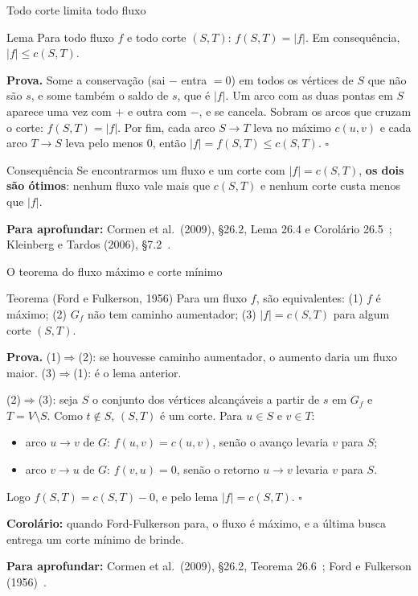 \documentclass[aspectratio=169,xcolor=table]{beamer}
\newcommand{\fonte}[1]{%
  \vfill
  {\tiny\color{gray!55!black}\textbf{Para aprofundar:} #1\par}%
}
\begin{document}
\begin{frame}{Todo corte limita todo fluxo}
  \begin{block}{Lema}
    \small
    Para todo fluxo $f$ e todo corte $(S,T)$: $f(S,T) = |f|$. Em consequência,
    $|f| \le c(S,T)$.
  \end{block}
  \scriptsize
  \textbf{Prova.} Some a conservação (sai $-$ entra $= 0$) em todos os vértices de $S$ que não
  são $s$, e some também o saldo de $s$, que é $|f|$. Um arco com as duas pontas em $S$ aparece
  uma vez com $+$ e outra com $-$, e se cancela. Sobram os arcos que cruzam o corte: $f(S,T) =
  |f|$. Por fim, cada arco $S \to T$ leva no máximo $c(u,v)$ e cada arco $T \to S$ leva pelo
  menos $0$, então $|f| = f(S,T) \le c(S,T)$. \hfill$\square$
  \medskip

  \begin{exampleblock}{Consequência}
    \small Se encontrarmos um fluxo e um corte com $|f| = c(S,T)$, \textbf{os dois são
    ótimos}: nenhum fluxo vale mais que $c(S,T)$ e nenhum corte custa menos que $|f|$.
  \end{exampleblock}
  \fonte{Cormen et al.\ (2009), \S 26.2, Lema 26.4 e Corolário 26.5~\cite{cormen2009introduction};
    Kleinberg e Tardos (2006), \S 7.2~\cite{kleinberg2006algorithm}.}
\end{frame}

\begin{frame}{O teorema do fluxo máximo e corte mínimo}
  \begin{block}{Teorema (Ford e Fulkerson, 1956)}
    \small
    Para um fluxo $f$, são equivalentes:
    (1) $f$ é máximo; (2) $G_f$ não tem caminho aumentador;
    (3) $|f| = c(S,T)$ para algum corte $(S,T)$.
  \end{block}
  \scriptsize
  \textbf{Prova.} (1)$\Rightarrow$(2): se houvesse caminho aumentador, o aumento daria um fluxo
  maior. (3)$\Rightarrow$(1): é o lema anterior.
  \smallskip

  (2)$\Rightarrow$(3): seja $S$ o conjunto dos vértices alcançáveis a partir de $s$ em $G_f$ e
  $T = V \setminus S$. Como $t \notin S$, $(S,T)$ é um corte. Para $u \in S$ e $v \in T$:
  \begin{itemize}
    \item arco $u \to v$ de $G$: $f(u,v) = c(u,v)$, senão o avanço levaria $v$ para $S$;
    \item arco $v \to u$ de $G$: $f(v,u) = 0$, senão o retorno $u \to v$ levaria $v$ para $S$.
  \end{itemize}
  Logo $f(S,T) = c(S,T) - 0$, e pelo lema $|f| = c(S,T)$. \hfill$\square$
  \medskip

  {\scriptsize\textbf{Corolário:} quando Ford-Fulkerson para, o fluxo é máximo, e a última busca
  entrega um corte mínimo de brinde.\par}
  \fonte{Cormen et al.\ (2009), \S 26.2, Teorema 26.6~\cite{cormen2009introduction};
    Ford e Fulkerson (1956)~\cite{ford1956maximal}.}
\end{frame}
\end{document}
